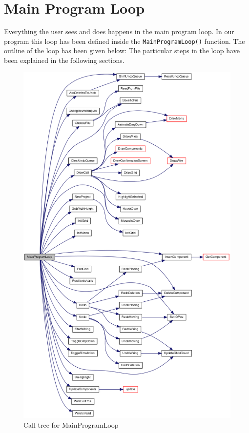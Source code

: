 \documentclass[report]{subfiles}
\begin{document}
    \section{Main Program Loop}
    Everything the user sees and does happens in the main program loop. In our program this loop has been defined inside the \texttt{MainProgramLoop()} function. The outline of the loop has been given below:
    The particular steps in the loop have been explained in the following sections.
    \begin{figure}[H]
        \centering
        \includegraphics[height=\textheight]{../graphics/main_loop_call_tree.png}
        \caption{Call tree for MainProgramLoop}
    \end{figure}
\end{document}

